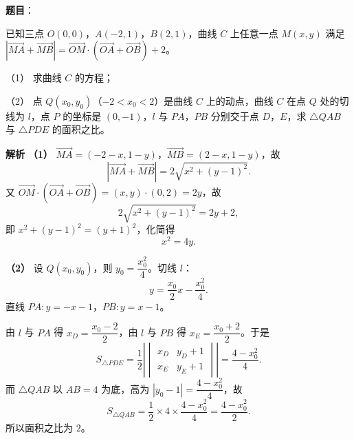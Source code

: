 \begin{answer}

\textbf{题目}：

已知三点 $O(0,0)$，$A(-2,1)$，$B(2,1)$，曲线 $C$ 上任意一点 $M(x,y)$ 满足 $\left|\overrightarrow{MA}+\overrightarrow{MB}\right|=\overrightarrow{OM}\cdot\left(\overrightarrow{OA}+\overrightarrow{OB}\right)+2$。

（1） 求曲线 $C$ 的方程；

（2） 点 $Q(x_0,y_0)$（$-2<x_0<2$）是曲线 $C$ 上的动点，曲线 $C$ 在点 $Q$ 处的切线为 $l$，点 $P$ 的坐标是 $(0,-1)$，$l$ 与 $PA$，$PB$ 分别交于点 $D$，$E$，求 $\triangle QAB$ 与 $\triangle PDE$ 的面积之比。

\textbf{解析}
\textbf{（1）} $\overrightarrow{MA}=(-2-x,1-y)$，$\overrightarrow{MB}=(2-x,1-y)$，故
\nopagebreak[4]
\[\left|\overrightarrow{MA}+\overrightarrow{MB}\right|=2\sqrt{x^2+(y-1)^2}.\]
又 $\overrightarrow{OM}\cdot(\overrightarrow{OA}+\overrightarrow{OB})=(x,y)\cdot(0,2)=2y$，故
\nopagebreak[4]
\[2\sqrt{x^2+(y-1)^2}=2y+2,\]
即 $x^2+(y-1)^2=(y+1)^2$，化简得
\nopagebreak[4]
\[x^2=4y.\]

\textbf{（2）} 设 $Q(x_0,y_0)$，则 $y_0=\dfrac{x_0^2}4$。切线 $l$：
\nopagebreak[4]
\[y=\frac{x_0}2x-\frac{x_0^2}4.\]
直线 $PA:y=-x-1$，$PB:y=x-1$。

由 $l$ 与 $PA$ 得 $x_D=\dfrac{x_0-2}2$，由 $l$ 与 $PB$ 得 $x_E=\dfrac{x_0+2}2$。于是
\nopagebreak[4]
\[S_{\triangle PDE}=\frac12\left|\begin{vmatrix}x_D&y_D+1\\x_E&y_E+1\end{vmatrix}\right|=\frac{4-x_0^2}4.\]
而 $\triangle QAB$ 以 $AB=4$ 为底，高为 $\left|y_0-1\right|=\dfrac{4-x_0^2}4$，故
\nopagebreak[4]
\[S_{\triangle QAB}=\frac12\times4\times\frac{4-x_0^2}4=\frac{4-x_0^2}2.\]
所以面积之比为 $2$。



\end{answer}
